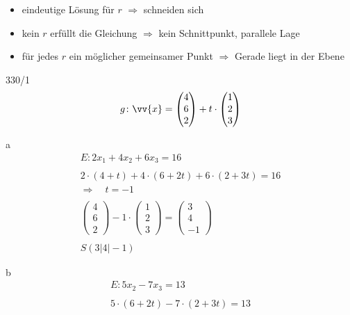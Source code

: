 \begin{itemize}
  \item eindeutige Lösung für $r$ $\Rightarrow$ schneiden sich
  \item kein $r$ erfüllt die Gleichung $\Rightarrow$ kein Schnittpunkt, parallele Lage
  \item für jedes $r$ ein möglicher gemeinsamer Punkt $\Rightarrow$ Gerade liegt in der Ebene
\end{itemize}
\begin{exercise}{330/1}
  \begin{gather*}
    g \colon \vv{x} = \begin{pmatrix}4 \\ 6 \\ 2\end{pmatrix} + t \cdot \begin{pmatrix}1 \\ 2 \\ 3\end{pmatrix}
  \end{gather*}
  \item [a]
  \begin{gather*}
    E \colon 2x_1 + 4x_2 + 6x_3 = 16 \\\\
    2 \cdot (4 + t) + 4 \cdot (6 + 2t) + 6 \cdot (2 + 3t) = 16 \\
    \Rightarrow\quad t = -1 \\\\
    \begin{pmatrix}4 \\ 6 \\ 2\end{pmatrix} - 1 \cdot \begin{pmatrix}1 \\ 2 \\ 3\end{pmatrix} = \begin{pmatrix}3 \\ 4 \\ -1\end{pmatrix} \\\\
    S(3|4|-1)
  \end{gather*}
  \item [b]
  \begin{gather*}
    E \colon 5x_2 - 7x_3 = 13 \\\\
    5 \cdot (6 + 2t) - 7 \cdot (2 + 3t) = 13 \\

\end{gather*}
\end{exercise}
